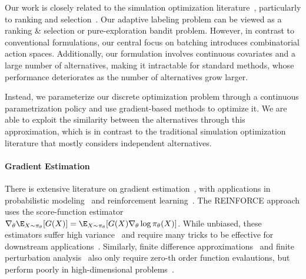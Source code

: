 Our work is closely related to the  simulation optimization literature~\citep{AmaranSaShBu16},
 particularly to ranking and selection~\citep{ChenLiYuCh00,GlynnJu04, KimNe07, ChenChLePu15, HongNeXu15}.
Our adaptive labeling problem can be viewed as a ranking \& selection or pure-exploration bandit problem. However, in contrast to conventional formulations, our central focus on batching
introduces combinatorial action spaces.
Additionally, our formulation involves continuous covariates and a large number of alternatives,   making it  intractable for standard methods, whose performance deteriorates as the number of alternatives grow larger. 

Instead, we parameterize our discrete optimization problem through a continuous parametrization policy and use gradient-based methods to optimize it. We are able to exploit the similarity between the alternatives through this approximation, which is in contrast to the  traditional simulation optimization literature that mostly considers independent alternatives. 

\paragraph{Gradient Estimation} 

There is extensive literature on gradient estimation~\citep{Glynn87, Glasserman90, Glasserman92, FuHu12}, with applications in probabilistic modeling~\citep{KingmaWe14,JangGuPo17} and reinforcement learning~\citep{Williams92,SuttonMcSiMa99}. 
The \textsf{REINFORCE} approach uses the score-function estimator~\citep{Williams92,SuttonMcSiMa99}
$\nabla_\theta \E_{X \sim \pi_\theta}[G(X)] = \E_{X \sim \pi_\theta}[G(X) \nabla_\theta\log \pi_\theta (X)]$. While unbiased, these estimators suffer high variance~\citep{GreensmithBaBa04} and require many tricks to be effective for downstream applications~\citep{HuangDoRaKaWa22}.
Similarly, finite difference approximations~\citep{FuHi97}  and finite perturbation analysis~\citep{Cao87,HoCaCh89} also only require zero-th order function evalautions, but perform poorly in high-dimensional problems~\citep{Glynn89, Glasserman04}.


